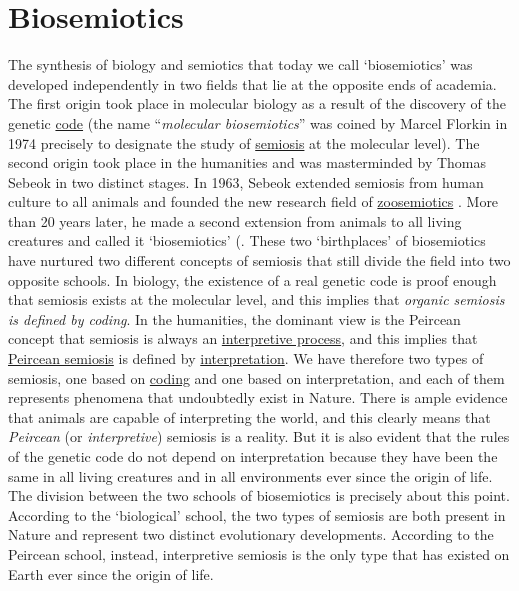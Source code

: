 \documentclass[12pt]{article}
\begin{document}
\section{Biosemiotics}
The synthesis of biology and semiotics that today we call `biosemiotics' was developed independently in two fields that lie at the opposite ends of academia. The first origin took place in molecular biology as a result of the discovery of the genetic \hyperlink{code}{code} (the name ``\textit{molecular biosemiotics}'' was coined by Marcel Florkin in 1974 \cite{florkin74:_molecular_biosemiotics} precisely to designate the study of \hyperlink{semiosis}{semiosis} at the molecular level). The second origin took place in the humanities and was masterminded by Thomas Sebeok in two distinct stages. In 1963, Sebeok extended semiosis from human culture to all animals and founded the new research field of  \hyperlink{zoosemiotics}{zoosemiotics} \cite{sebeok63:_communication}. More than 20 years later, he made a second extension from animals to all living creatures and called it `biosemiotics' (\cite{anderson84_semiotic_perspective_on_science,sebeok92:_semiotic_web,sebeok01:_biosemiotics}. These two `birthplaces' of biosemiotics have nurtured two different concepts of semiosis that still divide the field into two opposite schools. In biology, the existence of a real genetic code is proof enough that semiosis exists at the molecular level, and this implies that \textit{organic semiosis is defined by coding}. In the humanities, the dominant view is the Peircean concept that semiosis is always an \hyperlink{interpretive_semiosis}{interpretive process}, and this implies that \hyperlink{peirce_model_of_semiosis}{Peircean semiosis} is defined by \hyperlink{interpretation}{interpretation}. We have therefore two types of semiosis, one based on \hyperlink{copying_and_coding}{coding} and one based on interpretation, and each of them represents phenomena that undoubtedly exist in Nature. There is ample evidence that animals are capable of interpreting the world, and this clearly means that \textit{Peircean} (or \textit{interpretive}) semiosis is a reality. But it is also evident that the rules of the genetic code do not depend on interpretation because they have been the same in all living creatures and in all environments ever since the origin of life. The division between the two schools of biosemiotics is precisely about this point. According to the `biological' school, the two types of semiosis are both present in Nature and represent two distinct evolutionary developments. According to the Peircean school, instead, interpretive semiosis is the only type that has existed on Earth ever since the origin of life. 
\hypertarget{brain}{}
\end{document}
